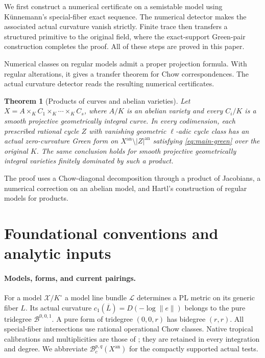 \documentclass[11pt,reqno]{amsart}
\newtheorem{theorem}{Theorem}[section]
\theoremstyle{definition}
\theoremstyle{remark}
\numberwithin{equation}{section}
\newcommand{\an}{\mathrm{an}}
\newcommand{\B}{\mathcal B}
\begin{document}
We first construct a numerical certificate on a semistable model
using K\"unnemann's special-fiber exact sequence.  The numerical
detector makes the associated actual curvature vanish strictly.
Finite trace then transfers a structured primitive to the original
field, where the exact-support Green-pair construction completes
the proof.  All of these steps are proved in this paper.

Numerical classes on regular models admit a proper projection
formula.  With regular alterations, it gives a transfer theorem
for Chow correspondences.  The actual curvature detector reads
the resulting numerical certificates.

\begin{theorem}[Products of curves and abelian varieties]
\label{thm:main-curve-products}
Let $X=A\times_K C_1\times_K\cdots\times_K C_s$, where $A/K$
is an abelian variety and every $C_i/K$ is a smooth projective
geometrically integral curve.  In every codimension, each
prescribed rational cycle $Z$ with vanishing geometric $\ell$-adic
cycle class has an actual zero-curvature Green form on
$X^{\an}\setminus|Z|^{\an}$ satisfying \eqref{eq:main-green}
over the original $K$.  The same conclusion holds for smooth
projective geometrically integral varieties finitely dominated
by such a product.
\end{theorem}

The proof uses a Chow-diagonal decomposition through a product
of Jacobians, a numerical correction on an abelian model,
and Hartl's construction of regular models for products.

\section{Foundational conventions and analytic inputs}
\label{sec:foundations}

\paragraph{Models, forms, and current pairings.}
For a model $\mathcal X/K^\circ$ a model line bundle
$\mathcal L$ determines a PL metric on its generic fiber $L$.
Its actual curvature $c_1(\overline L)=D(-\log\|e\|)$
belongs to the pure tridegree $\B^{0,0,1}$.
A pure form of tridegree $(0,0,r)$ has bidegree $(r,r)$.
All special-fiber intersections use rational operational Chow classes.
Native tropical calibrations and multiplicities are those of
\cite{M}; they are retained in every integration and degree.
We abbreviate $\B_c^{p,q}(X^{\an})$ for the compactly supported
actual tests.
\end{document}
